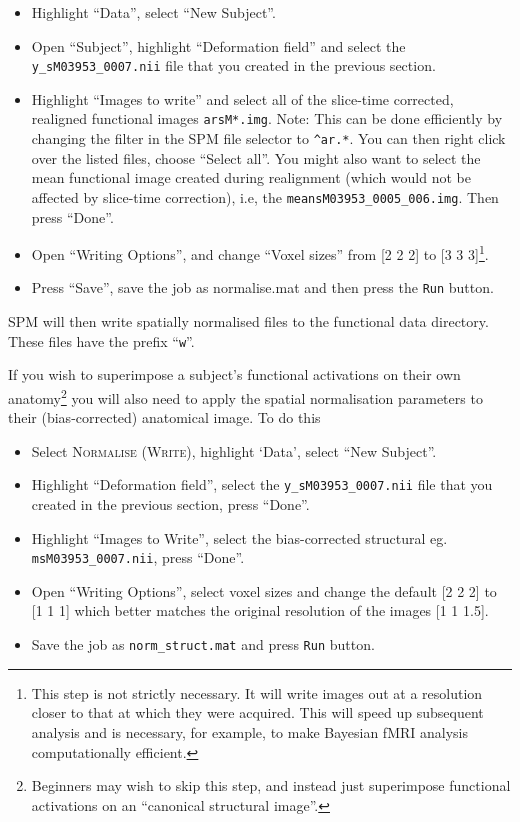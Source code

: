 \begin{itemize}
\item Highlight ``Data'', select ``New Subject''.
\item Open ``Subject'', highlight ``Deformation field'' and select the \texttt{y\_sM03953\_0007.nii} file that you created in the previous section.
\item Highlight ``Images to write'' and select all of the slice-time corrected, realigned functional images \texttt{arsM*.img}. Note: This can be done efficiently by changing the filter in the SPM file selector to \texttt{\textasciicircum ar.*}. You can then right click over the listed files, choose ``Select all''. You might also want to select the mean functional image created during realignment (which would not be affected by slice-time correction), i.e, the \texttt{meansM03953\_0005\_006.img}. Then press ``Done''.
\item Open ``Writing Options'', and change ``Voxel sizes'' from [2 2 2] to [3 3 3]\footnote{This step is not strictly necessary. It will write images out at a resolution closer to that at which they were acquired. This will speed up subsequent analysis and is necessary, for example, to make Bayesian fMRI analysis computationally efficient.}.
\item Press ``Save'', save the job as normalise.mat and then press the \texttt{Run} button.
\end{itemize}
SPM will then write spatially normalised files to the functional data directory. These files have the prefix ``\texttt{w}''.

If you wish to superimpose a subject's functional activations on their own anatomy\footnote{Beginners may wish to skip this step, and instead just superimpose functional activations on an ``canonical structural image''.} you will also need to apply the spatial normalisation parameters to their (bias-corrected) anatomical image. To do this
\begin{itemize}
\item Select \textsc{Normalise (Write)}, highlight `Data', select ``New Subject''.
\item Highlight ``Deformation field'', select the \texttt{y\_sM03953\_0007.nii} file that you created in the previous section, press ``Done''.
\item Highlight ``Images to Write'', select the bias-corrected structural eg. \texttt{msM03953\_0007.nii}, press ``Done''.
\item Open ``Writing Options'', select voxel sizes and change the default [2 2 2] to [1 1 1] which better matches the original resolution of the images [1 1 1.5].
\item Save the job as \texttt{norm\_struct.mat} and press \texttt{Run} button.
\end{itemize}

